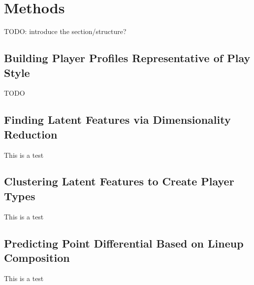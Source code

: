 
\chapter{Methods}
\label{ch:methods}

TODO: introduce the section/structure?

\section{Building Player Profiles Representative of Play Style}
\label{sec:profiles}

TODO

\section{Finding Latent Features via Dimensionality Reduction}
\label{sec:dim_red}
This is a test

\section{Clustering Latent Features to Create Player Types}
\label{sec:cluster}
This is a test

\section{Predicting Point Differential Based on Lineup Composition}
\label{sec:regress}
This is a test
